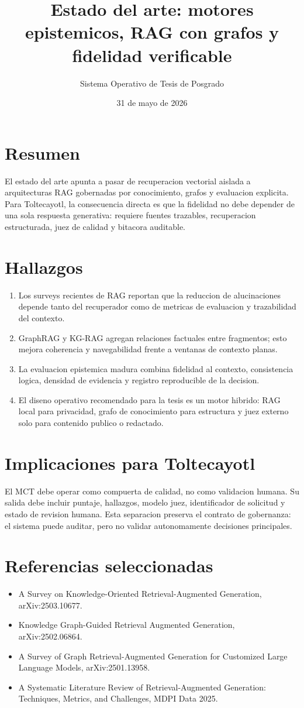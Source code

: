 \documentclass[11pt]{article}
\title{Estado del arte: motores epistemicos, RAG con grafos y fidelidad verificable}
\author{Sistema Operativo de Tesis de Posgrado}
\date{31 de mayo de 2026}
\begin{document}
\maketitle

\section*{Resumen}
El estado del arte apunta a pasar de recuperacion vectorial aislada a arquitecturas RAG gobernadas por conocimiento, grafos y evaluacion explicita. Para Toltecayotl, la consecuencia directa es que la fidelidad no debe depender de una sola respuesta generativa: requiere fuentes trazables, recuperacion estructurada, juez de calidad y bitacora auditable.

\section*{Hallazgos}
\begin{enumerate}[leftmargin=*]
\item Los surveys recientes de RAG reportan que la reduccion de alucinaciones depende tanto del recuperador como de metricas de evaluacion y trazabilidad del contexto.
\item GraphRAG y KG-RAG agregan relaciones factuales entre fragmentos; esto mejora coherencia y navegabilidad frente a ventanas de contexto planas.
\item La evaluacion epistemica madura combina fidelidad al contexto, consistencia logica, densidad de evidencia y registro reproducible de la decision.
\item El diseno operativo recomendado para la tesis es un motor hibrido: RAG local para privacidad, grafo de conocimiento para estructura y juez externo solo para contenido publico o redactado.
\end{enumerate}

\section*{Implicaciones para Toltecayotl}
El MCT debe operar como compuerta de calidad, no como validacion humana. Su salida debe incluir puntaje, hallazgos, modelo juez, identificador de solicitud y estado de revision humana. Esta separacion preserva el contrato de gobernanza: el sistema puede auditar, pero no validar autonomamente decisiones principales.

\section*{Referencias seleccionadas}
\begin{itemize}[leftmargin=*]
\item A Survey on Knowledge-Oriented Retrieval-Augmented Generation, arXiv:2503.10677.
\item Knowledge Graph-Guided Retrieval Augmented Generation, arXiv:2502.06864.
\item A Survey of Graph Retrieval-Augmented Generation for Customized Large Language Models, arXiv:2501.13958.
\item A Systematic Literature Review of Retrieval-Augmented Generation: Techniques, Metrics, and Challenges, MDPI Data 2025.
\end{itemize}
\end{document}
